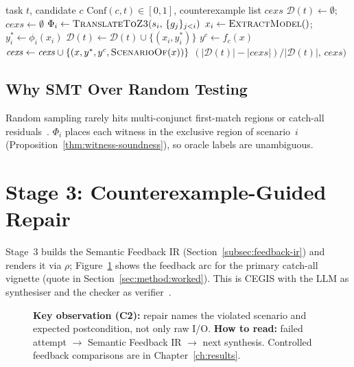 \begin{algorithm}[t]
\caption{SMT-Driven Formal Conformance Checking}
\label{alg:checker}
\begin{algorithmic}[1]
\Require task $t$, candidate $c$
\Ensure $\mathrm{Conf}(c,t) \in [0,1]$, counterexample list $\mathit{cexs}$
\State $\mathcal{D}(t) \leftarrow \emptyset$; $\mathit{cexs} \leftarrow \emptyset$
  \State $\Phi_i \leftarrow \textsc{TranslateToZ3}(s_i,\, \{g_j\}_{j<i})$
    \State $x_i \leftarrow \textsc{ExtractModel}()$; $y_i^* \leftarrow \phi_i(x_i)$
    \State $\mathcal{D}(t) \leftarrow \mathcal{D}(t) \cup \{(x_i, y_i^*)\}$
  \EndIf
\EndFor
{}
  \State $y^c \leftarrow f_c(x)$
    \State $\mathit{cexs} \leftarrow \mathit{cexs} \cup
           \{(x, y^*, y^c, \textsc{ScenarioOf}(x))\}$
  \EndIf
\EndFor
\State \Return $(|\mathcal{D}(t)| - |\mathit{cexs}|)/|\mathcal{D}(t)|,\, \mathit{cexs})$
\end{algorithmic}
\end{algorithm}

\subsection{Why SMT Over Random Testing}
\label{subsec:method:smt-rationale}

Random sampling rarely hits multi-conjunct first-match regions or catch-all
residuals~\citep{claessen2000quickcheck, zhu1997specification}.
$\Phi_i$ places each witness in the exclusive region of scenario~$i$
(Proposition~\ref{thm:witness-soundness}), so oracle labels are unambiguous.

\section{Stage 3: Counterexample-Guided Repair}
\label{sec:method:repair}

Stage~3 builds the Semantic Feedback IR
(Section~\ref{subsec:feedback-ir}) and renders it via $\rho$;
Figure~\ref{fig:repair-feedback} shows the feedback arc for the primary
catch-all vignette (quote in Section~\ref{sec:method:worked}).
This is CEGIS with the LLM as synthesiser and the checker as
verifier~\citep{sun2024clover, solarlezama2008sketching}.

\begin{figure}[t]
  \centering
  \caption{\textbf{Key observation (C2):} repair names the violated scenario
    and expected postcondition, not only raw I/O.
    \textbf{How to read:} failed attempt $\to$ Semantic Feedback IR $\to$ next
    synthesis.
    Controlled feedback comparisons are in Chapter~\ref{ch:results}.}
  \label{fig:repair-feedback}
\end{figure}

